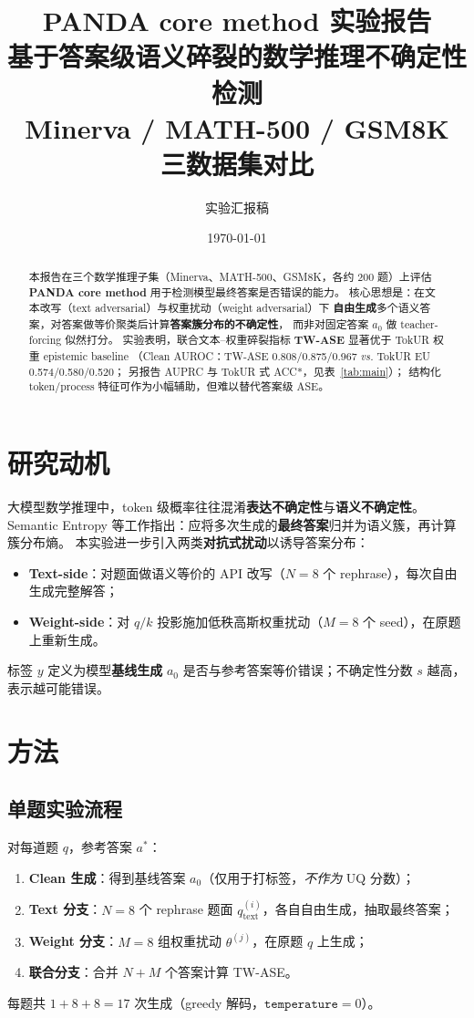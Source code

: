 \documentclass[11pt,a4paper]{article}
\title{\textbf{PANDA core method 实验报告}\\[0.4em]
\large 基于答案级语义碎裂的数学推理不确定性检测\\
\small Minerva / MATH-500 / GSM8K 三数据集对比}
\author{实验汇报稿}
\date{\today}
\begin{document}
\maketitle

\begin{abstract}
本报告在三个数学推理子集（Minerva、MATH-500、GSM8K，各约 200 题）上评估
\textbf{PANDA core method} 用于检测模型最终答案是否错误的能力。
核心思想是：在文本改写（text adversarial）与权重扰动（weight adversarial）下
\textbf{自由生成}多个语义答案，对答案做等价聚类后计算\textbf{答案簇分布的不确定性}，
而非对固定答案 $a_0$ 做 teacher-forcing 似然打分。
实验表明，联合文本--权重碎裂指标 \textbf{TW-ASE} 显著优于 TokUR 权重 epistemic baseline
（Clean AUROC：TW-ASE 0.808/0.875/0.967 \emph{vs.} TokUR EU 0.574/0.580/0.520；
另报告 AUPRC 与 TokUR 式 ACC*，见表~\ref{tab:main}）；
结构化 token/process 特征可作为小幅辅助，但难以替代答案级 ASE。
\end{abstract}

\section{研究动机}

大模型数学推理中，token 级概率往往混淆\textbf{表达不确定性}与\textbf{语义不确定性}。
Semantic Entropy 等工作指出：应将多次生成的\textbf{最终答案}归并为语义簇，再计算簇分布熵。
本实验进一步引入两类\textbf{对抗式扰动}以诱导答案分布：
\begin{itemize}
  \item \textbf{Text-side}：对题面做语义等价的 API 改写（$N{=}8$ 个 rephrase），每次自由生成完整解答；
  \item \textbf{Weight-side}：对 $q/k$ 投影施加低秩高斯权重扰动（$M{=}8$ 个 seed），在原题上重新生成。
\end{itemize}
标签 $y$ 定义为模型\textbf{基线生成} $a_0$ 是否与参考答案等价错误；不确定性分数 $s$ 越高，表示越可能错误。

\section{方法}

\subsection{单题实验流程}

对每道题 $q$，参考答案 $a^\ast$：
\begin{enumerate}
  \item \textbf{Clean 生成}：得到基线答案 $a_0$（仅用于打标签，\emph{不作为} UQ 分数）；
  \item \textbf{Text 分支}：$N{=}8$ 个 rephrase 题面 $q^{(i)}_{\mathrm{text}}$，各自自由生成，抽取最终答案；
  \item \textbf{Weight 分支}：$M{=}8$ 组权重扰动 $\theta^{(j)}$，在原题 $q$ 上生成；
  \item \textbf{联合分支}：合并 $N{+}M$ 个答案计算 TW-ASE。
\end{enumerate}
每题共 $1{+}8{+}8{=}17$ 次生成（greedy 解码，$\texttt{temperature}{=}0$）。
\end{document}
